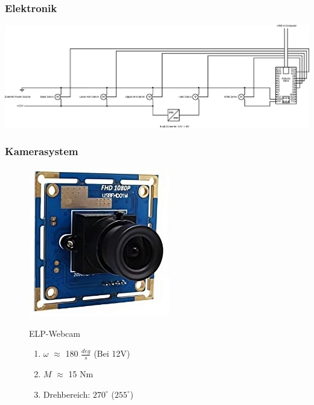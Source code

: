 \documentclass[aspectratio=169]{beamer}
\begin{document}
\begin{frame}[label = Circuit]
	\frametitle{Elektronik}

	\centering
	\includegraphics[width = 410pt]{../resources/circuit.png}

\end{frame}

\begin{frame}[label = Camera3D]
	\frametitle{Kamerasystem}

	\begin{figure}[h]
		\begin{minipage}[c]{.46\linewidth}
			\centering

			\includegraphics[width = 175pt]{../resources/ELP-Camera.png}
		\end{minipage}
		\hfill%
		\begin{minipage}[c]{.46\linewidth}
			\begin{block}{ELP-Webcam}
				\begin{enumerate}
					\item $\omega$ $\approx$ 180 $\frac{deg}{s}$ (Bei 12$\si{\volt}$)
					\item $M$ $\approx$ 15 $\si{\newton}\si{\meter}$
					\item Drehbereich: $270^\circ$ ($255^\circ$)
				\end{enumerate}
			\end{block}
		\end{minipage}
	\end{figure}

\end{frame}
\end{document}
